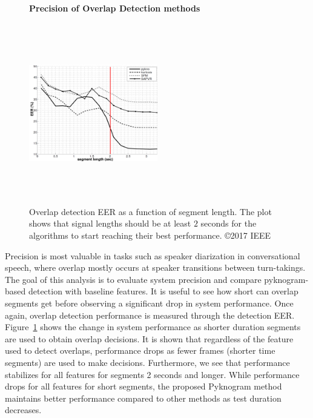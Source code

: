 {\begin{figure}[h!]
	\centering
	\hspace{-1mm}
	\textbf{Precision of Overlap Detection methods}\par\medskip
	\includegraphics[height = 3.1in, width=0.5\textwidth]{figures/eer_vs_time}
	\vspace{-1mm}
	\caption{ Overlap detection EER as a function of segment length. The plot shows that signal lengths should be at least $2$ seconds for the algorithms to start reaching their best performance. \copyright 2017 IEEE}
	\vspace{0mm}
	\label{fig:ch2_ovl_det_precision}
\end{figure}


Precision is most valuable in tasks such as speaker diarization in conversational speech, where overlap mostly occurs at speaker transitions between turn-takings. 
The goal of this analysis is to evaluate system precision and compare pyknogram-based detection with baseline features. 
It is useful to see how short can overlap segments get before observing a significant drop in system performance. 
Once again, overlap detection performance is measured through the detection EER. 
Figure~\ref{fig:ch2_ovl_det_precision} shows the change in system performance as shorter duration segments are used to obtain overlap decisions. 
It is shown that regardless of the feature used to detect overlaps, performance drops as fewer frames (shorter time segments) are used to make decisions. 
Furthermore, we see that performance stabilizes for all features for segments 2 seconds and longer. 
While performance drops for all features for short segments, the proposed Pyknogram method maintains better performance compared to other methods as test duration decreases. 


}
